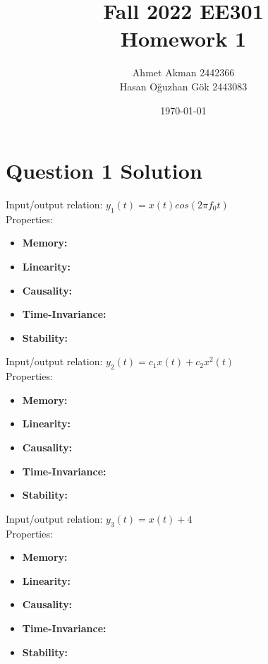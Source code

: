\documentclass[letterpaper,12pt]{article}
\begin{document}
\thispagestyle{empty}

\title{Fall 2022 EE301  \protect\\ Homework 1}
\author{Ahmet Akman 2442366 \protect\\ Hasan Oğuzhan Gök 2443083 }
\date{\today}
\maketitle
\tableofcontents
\section{Question 1 Solution}
Input/output relation: \(y_1(t)= x(t)cos(2 \pi f_0 t) \)
\\ Properties:

\begin{itemize}
    \item \textbf{Memory:} 
    \item \textbf{Linearity:}
    \item \textbf{Causality:}
    \item \textbf{Time-Invariance:}
    \item \textbf{Stability:}
\end{itemize}
Input/output relation: \(y_2(t)= c_1 x(t) + c_2 x^2(t) \)
\\ Properties:
\begin{itemize}
    \item \textbf{Memory:} 
    \item \textbf{Linearity:}
    \item \textbf{Causality:}
    \item \textbf{Time-Invariance:}
    \item \textbf{Stability:}
\end{itemize}

Input/output relation: \(y_3(t)= x(t)+4 \)
\\ Properties:
\begin{itemize}
    \item \textbf{Memory:} 
    \item \textbf{Linearity:}
    \item \textbf{Causality:}
    \item \textbf{Time-Invariance:}
    \item \textbf{Stability:}
\end{itemize}
\end{document}

